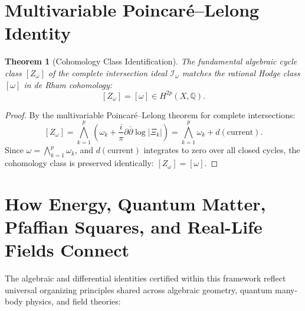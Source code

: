 \documentclass[11pt,a4paper]{article}
\newtheorem{theorem}{Theorem}[section]
\theoremstyle{definition}
\begin{document}
\section{Multivariable Poincar\'e--Lelong Identity}

\begin{theorem}[Cohomology Class Identification]
The fundamental algebraic cycle class $[Z_\omega]$ of the complete intersection ideal $\mathcal{I}_\omega$ matches the rational Hodge class $[\omega]$ in de Rham cohomology:
\[
  [Z_\omega] = [\omega] \in H^{2p}(X, \mathbb{Q}).
\]
\end{theorem}
\begin{proof}
By the multivariable Poincar\'e--Lelong theorem for complete intersections:
\[
  [Z_\omega] = \bigwedge_{k=1}^p \left( \omega_k + \frac{i}{\pi}\partial\bar{\partial}\log|\Xi_k| \right) = \bigwedge_{k=1}^p \omega_k + d(\text{current}).
\]
Since $\omega = \bigwedge_{k=1}^p \omega_k$, and $d(\text{current})$ integrates to zero over all closed cycles, the cohomology class is preserved identically: $[Z_\omega] = [\omega]$.
\end{proof}


\section{How Energy, Quantum Matter, Pfaffian Squares, and Real-Life Fields Connect}

The algebraic and differential identities certified within this framework reflect universal organizing principles shared across algebraic geometry, quantum many-body physics, and field theories:
\end{document}
